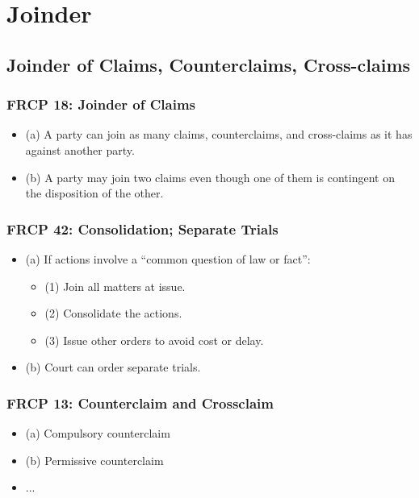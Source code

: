 \section{Joinder}

\subsection{Joinder of Claims, Counterclaims, Cross-claims}

\subsubsection{FRCP 18: Joinder of Claims}

\begin{itemize}
    \item (a) A party can join as many claims, counterclaims, and cross-claims as it has against another party.
    \item (b) A party may join two claims even though one of them is contingent on the disposition of the other.
\end{itemize}

\subsubsection{FRCP 42: Consolidation; Separate Trials}

\begin{itemize}
    \item (a) If actions involve a ``common question of law or fact'':
    \begin{itemize}
        \item (1) Join all matters at issue.
        \item (2) Consolidate the actions.
        \item (3) Issue other orders to avoid cost or delay.
    \end{itemize}
    \item (b) Court can order separate trials.
\end{itemize}

\subsubsection{FRCP 13: Counterclaim and Crossclaim}

\begin{itemize}
    \item (a) Compulsory counterclaim
    \item (b) Permissive counterclaim
    \item ... %
\end{itemize}

